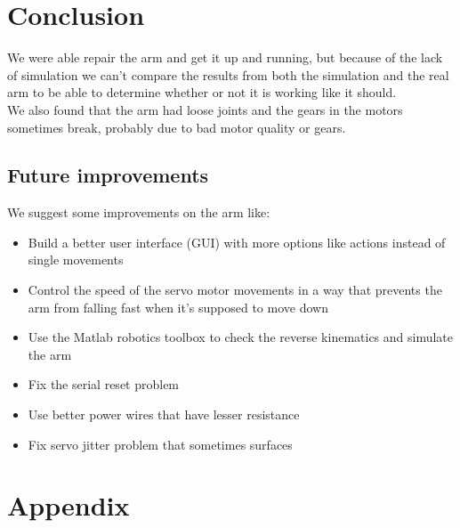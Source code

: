 \documentclass[11pt,a4paper]{report}
\begin{document}
\section{Conclusion}
We were able repair the arm and get it up and running, but because of the lack of simulation we can't compare the results from both the simulation and the real arm to be able to determine whether or not it is working like it should.\\
We also found that the arm had loose joints and the gears in the motors sometimes break, probably due to bad motor quality or gears.
\subsection{Future improvements}
We suggest some improvements on the arm like:
\begin{itemize}
\item Build a better user interface (GUI) with more options like actions instead of single movements
\item Control the speed of the servo motor movements in a way that prevents the arm from falling fast when it's supposed to move down
\item Use the Matlab robotics toolbox to check the reverse kinematics and simulate the arm \cite{toolbox}
\item Fix the serial reset problem \cite{arduinoreset}
\item Use better power wires that have lesser resistance
\item Fix servo jitter problem that sometimes surfaces
\end{itemize}
\pagebreak
\appendix
{}
\section{Appendix}
\end{document}
